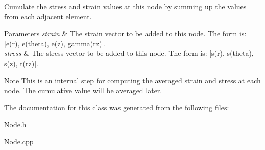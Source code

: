 Cumulate the stress and strain values at this node by summing up the values from each adjacent element. 


\begin{DoxyParams}{Parameters}
{\em strain} & The strain vector to be added to this node. The form is\+: \mbox{[}e(r), e(theta), e(z), gamma(rz)\mbox{]}. \\
\hline
{\em stress} & The stress vector to be added to this node. The form is\+: \mbox{[}s(r), s(theta), s(z), t(rz)\mbox{]}.\\
\hline
\end{DoxyParams}
\begin{DoxyNote}{Note}
This is an internal step for computing the averaged strain and stress at each node. The cumulative value will be averaged later. 
\end{DoxyNote}


The documentation for this class was generated from the following files\+:\begin{DoxyCompactItemize}
\item 
\mbox{\hyperlink{_node_8h}{Node.\+h}}\item 
\mbox{\hyperlink{_node_8cpp}{Node.\+cpp}}\end{DoxyCompactItemize}
